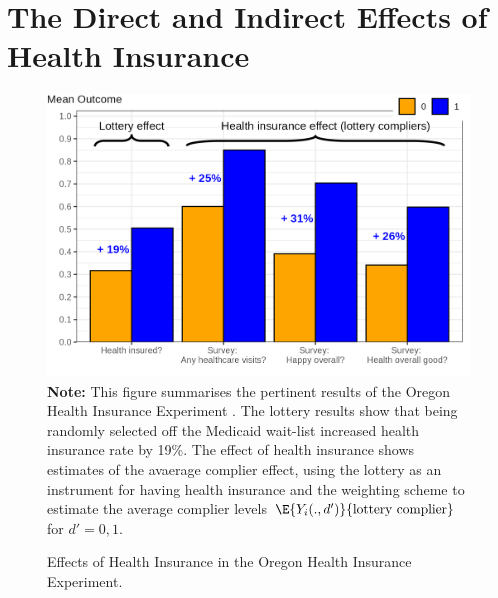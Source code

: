 \section{The Direct and Indirect Effects of Health Insurance}
\label{sec:healthinsurance}


\begin{figure}[h!]
    \caption{Effects of Health Insurance in the Oregon Health Insurance Experiment.}
    \includegraphics[width=\textwidth]{figures/insurance-effects.png}
    \label{fig:healthinsurance-effects}
    \justify
    \footnotesize    
    \textbf{Note:}
    This figure summarises the pertinent results of the Oregon Health Insurance Experiment \citep{finkelstein2008oregon}.
    The lottery results show that being randomly selected off the Medicaid wait-list increased health insurance rate by 19\%.
    The effect of health insurance shows estimates of the avaerage complier effect, using the lottery as an instrument for having health insurance and the \cite{abadie2003semiparametric} weighting scheme to estimate the average complier levels $\E{Y_i(., d')}{\text{lottery complier}}$ for $d'=0,1$.
\end{figure}
